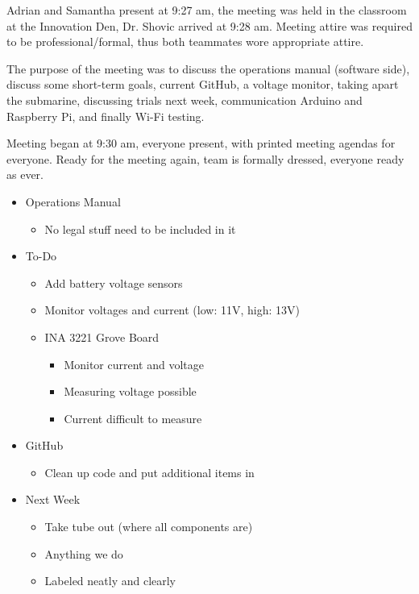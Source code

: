 \documentclass[12pt]{article}
\begin{document}
		\noindent
		Adrian and Samantha present at 9:27 am, the meeting was held in the classroom at the Innovation Den, Dr. Shovic arrived at 9:28 am. Meeting attire was required to be professional/formal, thus both teammates wore appropriate attire. 
		
		\noindent
		The purpose of the meeting was to discuss the operations manual (software side), discuss some short-term goals, current GitHub, a voltage monitor, taking apart the submarine, discussing trials next week, communication Arduino and Raspberry Pi, and finally Wi-Fi testing.
		
		\noindent
		Meeting began at 9:30 am, everyone present, with printed meeting agendas for everyone. Ready for the meeting again, team is formally dressed, everyone ready as ever. 
		
		\noindent
		\begin{itemize}
			\item Operations Manual
			\begin{itemize}
				\item No legal stuff need to be included in it
			\end{itemize}
			\item To-Do
			\begin{itemize}
				\item Add battery voltage sensors
				\item Monitor voltages and current (low: 11V, high: 13V)
				\item INA 3221 Grove Board
				\begin{itemize}
					\item Monitor current and voltage
					\item Measuring voltage possible
					\item Current difficult to measure
				\end{itemize}
			\end{itemize}
			\item GitHub
			\begin{itemize}
				\item Clean up code and put additional items in
			\end{itemize}
			\item Next Week
			\begin{itemize}
				\item Take tube out (where all components are)
				\item Anything we do
				\item Labeled neatly and clearly
			\end{itemize}

\end{itemize}
\end{document}
